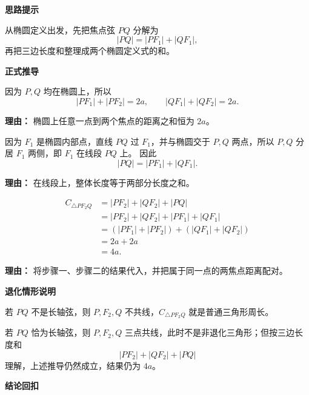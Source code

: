 \begin{proofbox}
	\textbf{\textcolor{CProof}{思路提示}}

	从椭圆定义出发，先把焦点弦 $PQ$ 分解为
	\[
		|PQ|=|PF_1|+|QF_1|,
	\]
	再把三边长度和整理成两个椭圆定义式的和。

	\medskip
	\textbf{\textcolor{CProof}{正式推导}}
	\begin{description}[style=nextline, leftmargin=2.8em, labelsep=0.5em, itemsep=0.55em]
		\item[\textbf{步骤一（椭圆定义）：}]
		      因为 $P,Q$ 均在椭圆上，所以
		      \[
			      |PF_1|+|PF_2|=2a,\qquad |QF_1|+|QF_2|=2a.
		      \]
		      \par\textbf{理由：} 椭圆上任意一点到两个焦点的距离之和恒为 $2a$。

		\item[\textbf{步骤二（弦长分解）：}]
		      因为 $F_1$ 是椭圆内部点，直线 $PQ$ 过 $F_1$，并与椭圆交于 $P,Q$ 两点，所以 $P,Q$ 分居 $F_1$ 两侧，即 $F_1$ 在线段 $PQ$ 上。
		      因此
		      \[
			      |PQ|=|PF_1|+|QF_1|.
		      \]
		      \par\textbf{理由：} 在线段上，整体长度等于两部分长度之和。

		\item[\textbf{步骤三（代入求和）：}]
		      \[
			      \begin{aligned}
				      C_{\triangle PF_2Q}
				       & = |PF_2|+|QF_2|+|PQ|              \\
				       & = |PF_2|+|QF_2|+|PF_1|+|QF_1|     \\
				       & = (|PF_1|+|PF_2|)+(|QF_1|+|QF_2|) \\
				       & = 2a+2a                           \\
				       & = 4a.
			      \end{aligned}
		      \]
		      \par\textbf{理由：} 将步骤一、步骤二的结果代入，并把属于同一点的两焦点距离配对。
	\end{description}

	\medskip
	\textbf{\textcolor{CProof}{退化情形说明}}

	若 $PQ$ 不是长轴弦，则 $P,F_2,Q$ 不共线，$C_{\triangle PF_2Q}$ 就是普通三角形周长。

	若 $PQ$ 恰为长轴弦，则 $P,F_2,Q$ 三点共线，此时不是非退化三角形；但按三边长度和
	\[
		|PF_2|+|QF_2|+|PQ|
	\]
	理解，上述推导仍然成立，结果仍为 $4a$。

	\medskip
	\textbf{\textcolor{CProof}{结论回扣}}


\end{proofbox}
